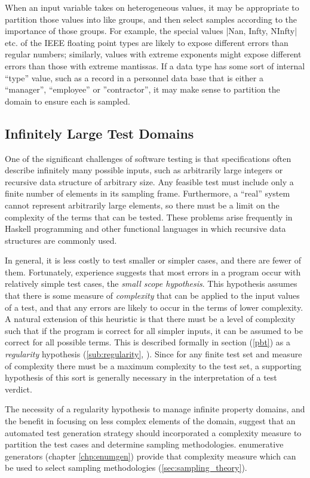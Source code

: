 When an input variable takes on heterogeneous values,
it may be appropriate to partition those values into like groups,
and then select samples according to the importance of those groups.
For example,
the special values |Nan, Infty, NInfty| etc. of the IEEE floating point types
are likely to expose different errors than regular numbers;
similarly, values with extreme exponents might
expose different errors than those with extreme mantissas.
If a data type has some sort of internal ``type'' value,
such as a record in a personnel data base that is either a ``manager'',
``employee'' or ''contractor'',
it may make sense to partition the domain to ensure each is sampled.

\subsection{Infinitely Large Test Domains}
One of the significant challenges of software testing
is that specifications often describe infinitely many possible inputs,
such as arbitrarily large integers or recursive data structure of arbitrary size.
Any feasible test must include only a finite number of elements
in its sampling frame.
Furthermore, a ``real'' system cannot represent arbitrarily large elements,
so there must be a limit on the complexity of the terms that can be tested.
These problems arise frequently in Haskell programming and other functional languages
in which recursive data structures are commonly used.

In general, it is less costly to test smaller or simpler cases,
and there are fewer of them.
Fortunately, experience suggests that
most errors in a program occur with relatively simple test cases,
the \emph{small scope hypothesis}.
This hypothesis assumes that
there is some measure of \emph{complexity}
that can be applied to the input values of a test,
and that any errors are likely to occur in the terms of lower complexity.
A natural extension of this heuristic is that
there must be a level of complexity such that
if the program is correct for all simpler inputs,
it can be assumed to be correct for all possible terms.
This is described formally in section (\ref{pbt})
as a \emph{regularity} hypothesis (\ref{sub:regularity}, \cite{BernotGaudelMarre1991}).
Since for any finite test set and measure of complexity
there must be a maximum complexity to the test set,
a supporting hypothesis of this sort is generally necessary
in the interpretation of a test verdict.

The necessity of a regularity hypothesis to manage infinite property domains,
and the benefit in focusing on less complex elements of the domain,
suggest that an automated test generation strategy should incorporated a complexity measure
to partition the test cases and determine sampling methodologies.
\GC enumerative generators (chapter \ref{chp:enumgen}) provide that complexity measure
which can be used to select sampling methodologies (\ref{sec:sampling_theory}).